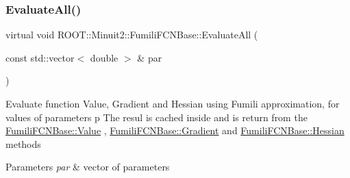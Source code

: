 \mbox{\label{classROOT_1_1Minuit2_1_1FumiliFCNBase_a0741bb4a7405cc33ab60583472a189cb}} 
\subsubsection{\texorpdfstring{EvaluateAll()}{EvaluateAll()}\hspace{0.1cm}{\footnotesize\ttfamily [2/3]}}
{\footnotesize\ttfamily virtual void R\+O\+O\+T\+::\+Minuit2\+::\+Fumili\+F\+C\+N\+Base\+::\+Evaluate\+All (\begin{DoxyParamCaption}\item[{const std\+::vector$<$ double $>$ \&}]{par }\end{DoxyParamCaption})\hspace{0.3cm}{\ttfamily [pure virtual]}}

Evaluate function Value, Gradient and Hessian using Fumili approximation, for values of parameters p The resul is cached inside and is return from the \mbox{\hyperlink{classROOT_1_1Minuit2_1_1FumiliFCNBase_a221dacee0ccde747a271a0cecd759f98}{Fumili\+F\+C\+N\+Base\+::\+Value}} , \mbox{\hyperlink{classROOT_1_1Minuit2_1_1FumiliFCNBase_ad226939ea2e83f754b5a6afc30876d3e}{Fumili\+F\+C\+N\+Base\+::\+Gradient}} and \mbox{\hyperlink{classROOT_1_1Minuit2_1_1FumiliFCNBase_ade134d8c6613393e942ef98d445db376}{Fumili\+F\+C\+N\+Base\+::\+Hessian}} methods


\begin{DoxyParams}{Parameters}
{\em par} & vector of parameters \\
\hline
\end{DoxyParams}


